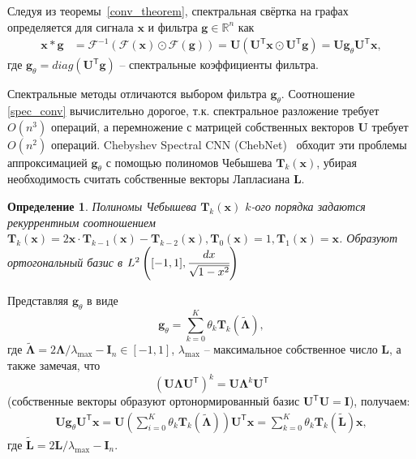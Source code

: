 \documentclass[14pt]{extarticle}
\newtheorem{Def}{Определение}
\begin{document}
Следуя из теоремы~\ref{conv_theorem}, спектральная свёртка на графах определяется для сигнала $\mathbf{x}$ и фильтра $\mathbf{g} \in \mathbb{R}^{n}$ как 
\begin{align}
\mathbf{x} * \mathbf{g} &=\mathscr{F}^{-1}(\mathscr{F}(\mathbf{x}) \odot \mathscr{F}(\mathbf{g})) =\mathbf{U}\left(\mathbf{U}^{\mathsf{T}} \mathbf{x} \odot \mathbf{U}^{\mathsf{T}} \mathbf{g}\right) = \mathbf{U g}_{\theta} \mathbf{U}^{\mathsf{T}} \mathbf{x},\label{spec_conv}
\end{align}
где $\mathbf{g}_{\theta} = diag\left(\mathbf{U}^{\mathsf{T}} \mathbf{g}\right)$ -- спектральные коэффициенты фильтра.

Спектральные методы отличаются выбором фильтра $\mathbf{g}_{\theta}$. Соотношение \ref{spec_conv} вычислительно дорогое, т.к. спектральное разложение требует $O\left(n^{3}\right)$ операций, а перемножение с матрицей собственных векторов $\mathbf{U}$ требует $O\left(n^{2}\right)$ операций. Chebyshev Spectral CNN (ChebNet)~\cite{NIPS2016_6081} обходит эти проблемы аппроксимацией $\mathbf{g}_{\theta}$ с помощью полиномов Чебышева $\mathbf{T}_k\mathbf{(x)}$, убирая необходимость считать собственные векторы Лапласиана $\mathbf{L}$.

\begin{Def}
	\textit{Полиномы Чебышева} $\mathbf{T}_k\mathbf{(x)}$ $k$-ого порядка задаются рекуррентным соотношением  $ \mathbf{T}_{k}(\mathbf{x})=2 \mathbf{x} \cdot \mathbf{T}_{k-1}(\mathbf{x})-\mathbf{T}_{k-2}(\mathbf{x}), \mathbf{T}_{0}(\mathbf{x})=1, \mathbf{T}_{1}(\mathbf{x})=\mathbf{x}$. Образуют ортогональный базис в $L^{2}\left([-1,1], \cfrac{d x} {\sqrt{1-x^{2}}}\right)$
\end{Def}

Представляя $\mathbf{g}_{\theta}$ в виде 
\[\mathbf{g}_{\theta}=\sum_{k=0}^{K} \theta_{k} \mathbf{T}_{k}\mathbf{(\tilde{\Lambda})},	\]
где $\mathbf{\tilde{\Lambda}} = 2 \mathbf{\Lambda} / \lambda_{\max }-\mathbf{I}_{n} \in[-1,1]$, $\lambda_{\max }$ -- максимальное собственное число $\mathbf{L}$, а также замечая, что 
\[
\left(\mathbf{U} \mathbf{\Lambda} \mathbf{U}^{\mathsf{T}}\right)^{k}=\mathbf{U} \mathbf{\Lambda}^{k} \mathbf{U}^{\mathsf{T}}
\]
(собственные векторы образуют ортонормированный базис $\mathbf{U}^{\mathsf{T}}\mathbf{U}=\mathbf{I}$), получаем:
\begin{align}
\mathbf{U g}_{\theta} \mathbf{U}^{\mathsf{T}} \mathbf{x}=\mathbf{U}\left(\sum_{i=0}^{K} \theta_{k} \mathbf{T}_{k}(\tilde{\mathbf{\Lambda}})\right) \mathbf{U}^{\mathsf{T}} \mathbf{x} = \sum_{k=0}^{K} \theta_{k} \mathbf{T}_{k}(\tilde{\mathbf{L}}) \mathbf{x},
\label{cheb_appr}
\end{align}
где $\tilde{\mathbf{L}}=2 \mathbf{L} / \lambda_{\max }-\mathbf{I}_{n}$.
\end{document}
